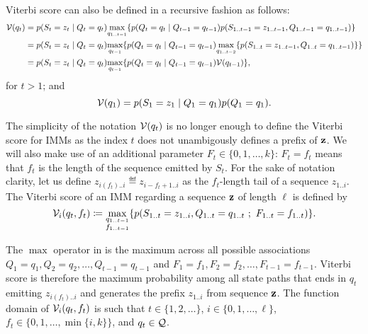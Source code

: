 Viterbi score can also be defined in a recursive fashion as follows:
\begin{equation*}
\begin{split}
  \mathcal{V}(q_t)
  &= p(S_t=z_t \;|\; Q_t=q_t) \underset{q_{1..t-1}}{\max}
    \{ p(Q_t=q_t \;|\; Q_{t-1}=q_{t-1}) p(S_{1..t-1}=z_{1..t-1}, Q_{1..t-1}=q_{1..t-1}) \} \\
  &= p(S_t=z_t \;|\; Q_t=q_t) \underset{q_{t-1}}{\max}
    \{ p(Q_t=q_t \;|\; Q_{t-1}=q_{t-1})
    \underset{q_{1..t-2}}{\max} \{ p(S_{1..t}=z_{1..t-1}, Q_{1..t}=q_{1..t-1}) \} \} \\
  &= p(S_t=z_t \;|\; Q_t=q_t) \underset{q_{t-1}}{\max} \{ p(Q_t=q_t \;|\; Q_{t-1}=q_{t-1})
    \mathcal{V}(q_{t-1}) \},
\end{split}
\end{equation*}
for $t>1$; and
\begin{equation*}
  \mathcal{V}(q_1) = p(S_1=z_1 \;|\; Q_1=q_1) p(Q_1=q_1).
\end{equation*}



The simplicity of the notation $\mathcal{V}(q_t)$ is no longer enough to define the Viterbi score for
IMMs as the index $t$ does not unambigously defines a prefix of $\mathbf{z}$. We will also make use of
an additional parameter $F_t\in \{0, 1, \dots, k\}$: $F_t=f_t$ means that $f_t$ is the length of the
sequence emitted by $S_t$.
For the sake of notation clarity, let us define $z_{i(f_t)..i} \eqdef
z_{i-f_t+1..i}$ as the $f_t$-length tail of a sequence $z_{1..i}$. The Viterbi score of an IMM
regarding a sequence $\mathbf{z}$ of length $\ell$ is defined by
\begin{equation}\label{eq:viterbi}
  \mathcal{V}_{i}(q_t,f_t) \coloneqq
    \underset{\substack{q_{1..t-1}\\f_{1..t-1}}}{\max}
    \{
      p(S_{1..t}=z_{1..i}, Q_{1..t}=q_{1..t} ~;~ F_{1..t}=f_{1..t})
    \}.
\end{equation}

The $\max$ operator in  is the maximum across all possible associations
$Q_1=q_1, Q_2=q_2, \dots, Q_{t-1}=q_{t-1}$ and $F_1=f_1, F_2=f_2, \dots, F_{t-1}=f_{t-1}$. Viterbi
score is therefore the maximum probability among all state paths that ends in $q_t$ emitting
$z_{i(f_t)..i}$ and generates the prefix $z_{1..i}$ from sequence $\mathbf{z}$. The function domain of
$\mathcal{V}_{i}(q_t,f_t)$ is such that $t \in \{1, 2, \dots\}$, $i \in \{0, 1, \dots, \ell\}$, $f_t
\in \{0, 1, \dots, \min\{i, k\}\}$, and $q_t \in \mathcal{Q}$.

